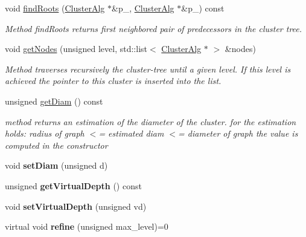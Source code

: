 \begin{DoxyCompactItemize}
void \hyperlink{classClusterAlg_a108b12bb473f429c897e7ba004dd8b62}{find\-Roots} (\hyperlink{classClusterAlg}{\-Cluster\-Alg} $\ast$\&p\-\_, \hyperlink{classClusterAlg}{\-Cluster\-Alg} $\ast$\&p\-\_) const 
\begin{DoxyCompactList}\small\item\em \-Method find\-Roots returns first neighbored pair of predecessors in the cluster tree. \end{DoxyCompactList}\item 
void \hyperlink{classClusterAlg_ab4050fdfb42dc0ebec40c7464bbaf4ab}{get\-Nodes} (unsigned level, std\-::list$<$ \hyperlink{classClusterAlg}{\-Cluster\-Alg} $\ast$ $>$ \&nodes)
\begin{DoxyCompactList}\small\item\em \-Method traverses recursively the cluster-\/tree until a given level. \-If this level is achieved the pointer to this cluster is inserted into the list. \end{DoxyCompactList}\item 
\hypertarget{classClusterAlg_aa2c3643c9a48e40c8adb7acbd3011ec5}{
unsigned \hyperlink{classClusterAlg_aa2c3643c9a48e40c8adb7acbd3011ec5}{get\-Diam} () const }
\label{classClusterAlg_aa2c3643c9a48e40c8adb7acbd3011ec5}

\begin{DoxyCompactList}\small\item\em method returns an estimation of the diameter of the cluster. for the estimation holds\-: radius of graph $<$= estimated diam $<$= diameter of graph the value is computed in the constructor \end{DoxyCompactList}\item 
\hypertarget{classClusterAlg_abef00c7a121ff7af20898688e2a2d3db}{
void {\bfseries set\-Diam} (unsigned d)}
\label{classClusterAlg_abef00c7a121ff7af20898688e2a2d3db}

\item 
\hypertarget{classClusterAlg_ac25fcff58a42fd7703320154a7fa237b}{
unsigned {\bfseries get\-Virtual\-Depth} () const }
\label{classClusterAlg_ac25fcff58a42fd7703320154a7fa237b}

\item 
\hypertarget{classClusterAlg_ad04c66e0c57ef73831a87ce6b5e98d96}{
void {\bfseries set\-Virtual\-Depth} (unsigned vd)}
\label{classClusterAlg_ad04c66e0c57ef73831a87ce6b5e98d96}

\item 
\hypertarget{classClusterAlg_ad1b8fae8a667f970373e9d20b99e335e}{
virtual void {\bfseries refine} (unsigned max\-\_\-level)=0}
\label{classClusterAlg_ad1b8fae8a667f970373e9d20b99e335e}

\end{DoxyCompactItemize}


